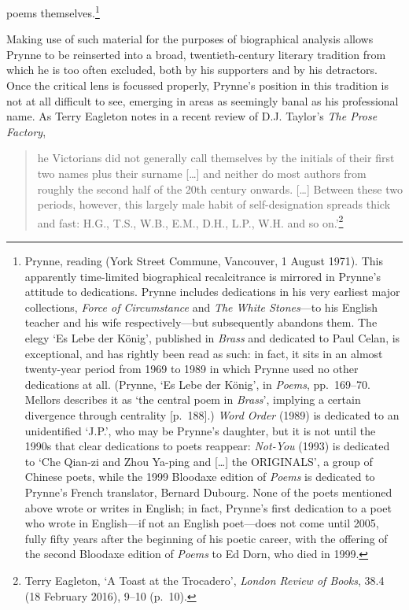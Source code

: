 \documentclass[]{article}
\begin{document}
poems themselves.\footnote{Prynne, reading (York Street Commune,
  Vancouver, 1 August 1971). This apparently time-limited biographical
  recalcitrance is mirrored in Prynne’s attitude to dedications. Prynne
  includes dedications in his very earliest major collections,
  \emph{Force of Circumstance} and \emph{The White Stones}—to his
  English teacher and his wife respectively—but subsequently abandons
  them. The elegy ‘Es Lebe der König’, published in \emph{Brass} and
  dedicated to Paul Celan, is exceptional, and has rightly been read as
  such: in fact, it sits in an almost twenty-year period from 1969 to
  1989 in which Prynne used no other dedications at all. (Prynne, ‘Es
  Lebe der König’, in \emph{Poems}, pp.~169–70. Mellors describes it as
  ‘the central poem in \emph{Brass}’, implying a certain divergence
  through centrality {[}p.~188{]}.) \emph{Word Order} (1989) is
  dedicated to an unidentified ‘J.P.’, who may be Prynne’s daughter, but
  it is not until the 1990s that clear dedications to poets reappear:
  \emph{Not-You} (1993) is dedicated to ‘Che Qian-zi and Zhou Ya-ping
  \textbar{} and {[}\ldots{}{]} the ORIGINALS’, a group of Chinese
  poets, while the 1999 Bloodaxe edition of \emph{Poems} is dedicated to
  Prynne’s French translator, Bernard Dubourg. None of the poets
  mentioned above wrote or writes in English; in fact, Prynne’s first
  dedication to a poet who wrote in English—if not an English poet—does
  not come until 2005, fully fifty years after the beginning of his
  poetic career, with the offering of the second Bloodaxe edition of
  \emph{Poems} to Ed Dorn, who died in 1999.}

Making use of such material for the purposes of biographical analysis
allows Prynne to be reinserted into a broad, twentieth-century literary
tradition from which he is too often excluded, both by his supporters
and by his detractors. Once the critical lens is focussed properly,
Prynne’s position in this tradition is not at all difficult to see,
emerging in areas as seemingly banal as his professional name. As Terry
Eagleton notes in a recent review of D.J. Taylor’s \emph{The Prose
Factory},

\begin{quote}
\singlespacing [t]he Victorians did not generally call themselves by the
initials of their first two names plus their surname {[}\ldots{}{]} and
neither do most authors from roughly the second half of the 20th century
onwards. {[}\ldots{}{]} Between these two periods, however, this largely
male habit of self-designation spreads thick and fast: H.G., T.S., W.B.,
E.M., D.H., L.P., W.H. and so on.’\footnote{Terry Eagleton, ‘A Toast at
  the Trocadero’, \emph{London Review of Books}, 38.4 (18 February
  2016), 9–10 (p.~10).}
\end{quote}
\end{document}
